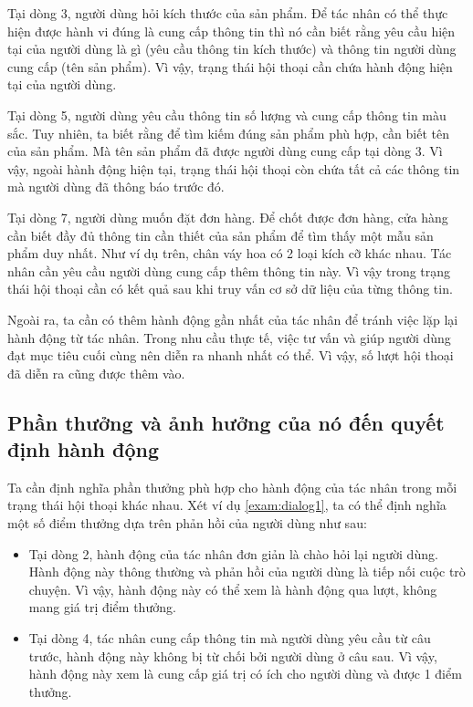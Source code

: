 Tại dòng 3, người dùng hỏi kích thước của sản phẩm. Để tác nhân có thể thực hiện được hành vi đúng là cung cấp thông tin thì nó cần biết rằng yêu cầu hiện tại của người dùng là gì (yêu cầu thông tin kích thước) và thông tin người dùng cung cấp (tên sản phẩm). Vì vậy, trạng thái hội thoại cần chứa hành động hiện tại của người dùng.

Tại dòng 5, người dùng yêu cầu thông tin số lượng và cung cấp thông tin màu sắc. Tuy nhiên, ta biết rằng để tìm kiếm đúng sản phẩm phù hợp, cần biết tên của sản phẩm. Mà tên sản phẩm đã được người dùng cung cấp tại dòng 3. Vì vậy, ngoài hành động hiện tại, trạng thái hội thoại còn chứa tất cả các thông tin mà người dùng đã thông báo trước đó.

Tại dòng 7, người dùng muốn đặt đơn hàng. Để chốt được đơn hàng, cửa hàng cần biết đầy đủ thông tin cần thiết của sản phẩm để tìm thấy một mẫu sản phẩm duy nhất. Như ví dụ trên, chân váy hoa có 2 loại kích cỡ khác nhau. Tác nhân cần yêu cầu người dùng cung cấp thêm thông tin này. Vì vậy trong trạng thái hội thoại cần có kết quả sau khi truy vấn cơ sở dữ liệu của từng thông tin.

Ngoài ra, ta cần có thêm hành động gần nhất của tác nhân để tránh việc lặp lại hành động từ tác nhân. Trong nhu cầu thực tế, việc tư vấn và giúp người dùng đạt mục tiêu cuối cùng nên diễn ra nhanh nhất có thể. Vì vậy, số lượt hội thoại đã diễn ra cũng được thêm vào.

\subsection{Phần thưởng và ảnh hưởng của nó đến quyết định hành động}
\label{subsec:reward}
Ta cần định nghĩa phần thưởng phù hợp cho hành động của tác nhân trong mỗi trạng thái hội thoại khác nhau. Xét ví dụ \ref{exam:dialog1}, ta có thể định nghĩa một số điểm thưởng dựa trên phản hồi của người dùng như sau:

\begin{itemize}
    \item Tại dòng 2, hành động của tác nhân đơn giản là chào hỏi lại người dùng. Hành động này thông thường và phản hồi của người dùng là tiếp nối cuộc trò chuyện. Vì vậy, hành động này có thể xem là hành động qua lượt, không mang giá trị điểm thưởng.
    \item Tại dòng 4, tác nhân cung cấp thông tin mà người dùng yêu cầu từ câu trước, hành động này không bị từ chối bởi người dùng ở câu sau. Vì vậy, hành động này xem là cung cấp giá trị có ích cho người dùng và được 1 điểm thưởng.
\end{itemize}

